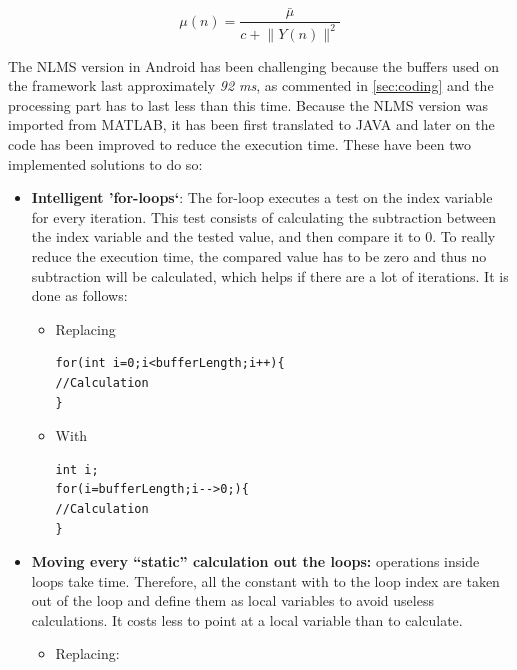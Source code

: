\documentclass[11pt,a4paper,english]{book}  %
\theoremstyle{definition}  %
\theoremstyle{plain}  %
\theoremstyle{remark}  %
\begin{document}
		
		
	\begin{equation}
	\label{eq:nlms}
		\mu (n)=\frac{\bar{\mu}}{c+\lVert Y(n)\rVert^2}
	\end{equation}
	
	The NLMS version in Android has been challenging because the buffers used on the framework last approximately \textit{92 ms}, as commented in \ref{sec:coding} and the processing part has to last less than this time. Because the NLMS version was imported from MATLAB, it has been first translated to JAVA and later on the code has been improved to reduce the execution time. These have been two implemented solutions to do so:
	
	\begin{itemize}
	\item \textbf{Intelligent 'for-loops`}: The for-loop executes a test on the index variable for every iteration. This test consists of calculating the subtraction between the index variable and the tested value, and then compare it to $0$. To really reduce the execution time, the compared value has to be zero and thus no subtraction will be calculated, which helps if there are a lot of iterations. It is done as follows:
	
		\begin{itemize}
			\item Replacing
			
\begin{lstlisting}
for(int i=0;i<bufferLength;i++){
//Calculation
}
\end{lstlisting}
			
			\item With
			
\begin{lstlisting}
int i;
for(i=bufferLength;i-->0;){
//Calculation
}

\end{lstlisting}
	
		\end{itemize}
	
	\item \textbf{Moving every “static” calculation out the loops:}  operations inside loops take time. Therefore, all the constant with to the loop index are taken out of the loop and define them as local variables to avoid useless calculations. It costs less to point at a local variable than to calculate.
	
	\begin{itemize}
	\item Replacing:
	

\end{itemize}
\end{itemize}
\end{document}
